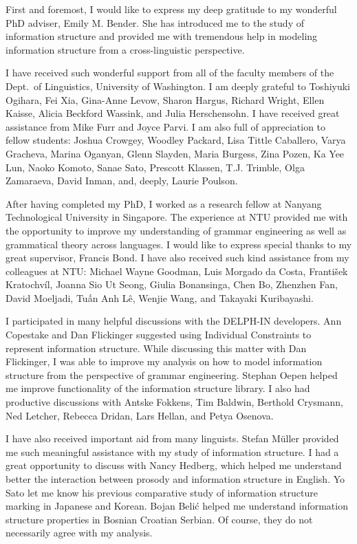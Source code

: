 \begin{refsection}

First and foremost, I would like to express my deep gratitude to my
wonderful PhD adviser, Emily M. Bender. She has introduced me to the
study of information structure and provided me with tremendous help in
modeling information structure from a cross-linguistic perspective.


I have received such wonderful support from all of the faculty members
of the Dept.\ of Linguistics, University of Washington. I am deeply
grateful to Toshiyuki Ogihara, Fei Xia, Gina-Anne Levow, Sharon
Hargus, Richard Wright, Ellen Kaisse, Alicia Beckford Wassink, and
Julia Herschensohn. I have received great assistance from Mike Furr
and Joyce Parvi. I am also full of appreciation to fellow students:
Joshua Crowgey, Woodley Packard, Lisa Tittle Caballero, Varya
Gracheva, Marina Oganyan, Glenn Slayden, Maria Burgess, Zina Pozen, Ka
Yee Lun, Naoko Komoto, Sanae Sato, Prescott Klassen, T.J. Trimble,
Olga Zamaraeva, David Inman, and, deeply, Laurie Poulson.


After having completed my PhD, I worked as a research fellow at
Nanyang Technological University in Singapore. The experience at NTU
provided me with the opportunity to improve my understanding of
grammar engineering as well as grammatical theory across languages. I
would like to express special thanks to my great supervisor, Francis
Bond. I have also received such kind assistance from my colleagues at
NTU: Michael Wayne Goodman, Luis Morgado da Costa, Franti\v{s}ek
Kratochvíl, Joanna Sio Ut Seong, Giulia Bonansinga, Chen Bo, Zhenzhen
Fan, David Moeljadi, Tu{\'{\^{a}}}n Anh L\^{e}, Wenjie Wang, and
Takayaki Kuribayashi.


I participated in many helpful discussions with the DELPH-IN
developers. Ann Copestake and Dan Flickinger suggested using
Individual Constraints to represent information structure.  While
discussing this matter with Dan Flickinger, I was able to improve my
analysis on how to model information structure from the perspective of
grammar engineering. Stephan Oepen helped me improve functionality of
the information structure library.  I also had productive discussions
with Antske Fokkens, Tim Baldwin, Berthold Crysmann, Ned Letcher,
Rebecca Dridan, Lars Hellan, and Petya Osenova.



I have also received important aid from many linguists. Stefan
M{\"u}ller provided me such meaningful assistance with my study of
information structure. I had a great opportunity to discuss with 
Nancy Hedberg, which helped me understand better the interaction between 
prosody and information structure in English.  
Yo Sato let me know his previous comparative
study of information structure marking in Japanese and Korean. Bojan
Beli{\'c} helped me understand information structure properties in
Bosnian Croatian Serbian. 
Of course, they do not necessarily agree with my analysis.




\end{refsection}
